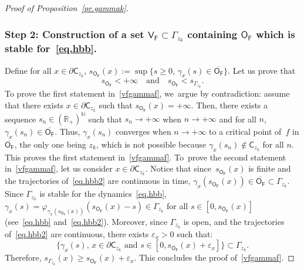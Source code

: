 \documentclass[JEP,XML,SOM,Unicode,NoEqCountersInSection,NoFloatCountersInSection,published]{cedram}
\newcommand{\quand}{\quad\text{and}\quad}
\let\pa\partial
\let\ve\varepsilon
\theoremstyle{plain}
\theoremstyle{definition}
\begin{document}
\begin{proof}[Proof of Proposition~\ref{pr.gammak}]
\subsubsection*{Step 2: Construction of a set $\mathsf V_{\mathsf F}\subset \Gamma_{z_k}$ containing $\mathsf O_{\mathsf F}$ which is stable for~\eqref{eq.hbb}. }
Define for all $x\in \pa \mathsf C_{z_k}$, $ s_{\mathsf O_{\mathsf F}}(x):=\sup \{s\ge 0, \, \gamma_x(s) \in\overline{\mathsf O_{\mathsf F}}\}$. Let us prove that
\begin{equation}\label{vfgammaf}
s_{\mathsf O_{\mathsf F}} <+\infty \quand s_{\mathsf O_{\mathsf F}}< s_{\Gamma_{z_k}}.
\end{equation}
To prove the first statement in~\eqref{vfgammaf}, we~argue by contradiction:
assume that there exists $x\in \pa \mathsf C_{z_k}$ such that $s_{\mathsf O_{\mathsf F}}(x)=+\infty$. Then, there exists a sequence $s_n\in (\mathbb R_+)^{\mathbb N}$ such that $s_n\to +\infty$ when $n \to +\infty$ and for all $n$, $\gamma_x(s_n)\in \overline{\mathsf O_{\mathsf F}}$. Thus, $\gamma_x(s_n)$ converges when $n\to +\infty$ to a critical point of~$f$ in $\overline{\mathsf O_{\mathsf F}}$, the only one being $z_k$, which is not possible because $\gamma_x(s_n)\notin { \mathsf C_{z_k}}$ for all $n$.
This proves the first statement in~\eqref{vfgammaf}. To~prove the second statement in~\eqref{vfgammaf}, let us consider $x\in \pa \mathsf C_{z_k}$. Notice that since~$s_{\mathsf O_{\mathsf F}}(x)$ is finite and the trajectories of~\eqref{eq.hbb2} are continuous in time, $\gamma_x(s_{\mathsf O_{\mathsf F}}(x)) \in
\overline{\mathsf O_{\mathsf F}} \subset \Gamma_{z_k}$. Since $\Gamma_{z_k}$ is stable for the dynamics~\eqref{eq.hbb}, \hbox{$\gamma_x(s)=\varphi_{\gamma_x(s_{\mathsf O_{\mathsf F}}(x))} (s_{\mathsf O_{\mathsf F}}(x)-s) \in \Gamma_{z_k}$} for all $s\in [0,s_{\mathsf O_{\mathsf F}}(x)]$ (see~\eqref{eq.hbb} and~\eqref{eq.hbb2}).
Moreover, since $\Gamma_{z_k}$ is open, and the trajectories of~\eqref{eq.hbb2} are continuous, there exists $\ve_x>0$ such that:
\begin{equation}\label{inclutube}
\big \{ \gamma_x(s), \, x\in \pa \mathsf C_{z_k} \text{ and } s\in [0,s_{\mathsf O_{\mathsf F}}(x)+\ve_x]\big \} \subset \Gamma_{z_k}.
\end{equation}
Therefore, $ s_{\Gamma_{z_k}}(x)\ge s_{\mathsf O_{\mathsf
F}}(x)+\ve_x$. This concludes the proof of~\eqref{vfgammaf}.


\end{proof}
\end{document}
